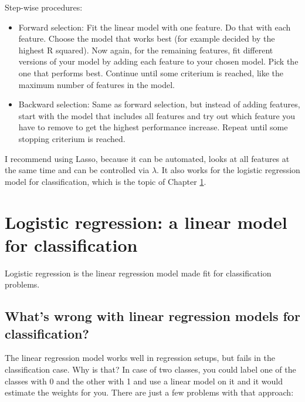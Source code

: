 \documentclass[12pt,]{krantz}
\providecommand{\tightlist}{%
  \setlength{\itemsep}{0pt}\setlength{\parskip}{0pt}}
\theoremstyle{definition}
\theoremstyle{definition}
\theoremstyle{definition}
\theoremstyle{remark}
\begin{document}
Step-wise procedures:

\begin{itemize}
\tightlist
\item
  Forward selection: Fit the linear model with one feature. Do that with
  each feature. Choose the model that works best (for example decided by
  the highest R squared). Now again, for the remaining features, fit
  different versions of your model by adding each feature to your chosen
  model. Pick the one that performs best. Continue until some criterium
  is reached, like the maximum number of features in the model.
\item
  Backward selection: Same as forward selection, but instead of adding
  features, start with the model that includes all features and try out
  which feature you have to remove to get the highest performance
  increase. Repeat until some stopping criterium is reached.
\end{itemize}

I recommend using Lasso, because it can be automated, looks at all
features at the same time and can be controlled via \(\lambda\). It also
works for the logistic regression model for classification, which is the
topic of Chapter \ref{logistic}.

\section{Logistic regression: a linear model for
classification}\label{logistic}

Logistic regression is the linear regression model made fit for
classification problems.

\subsection{What's wrong with linear regression models for
classification?}\label{whats-wrong-with-linear-regression-models-for-classification}

The linear regression model works well in regression setups, but fails
in the classification case. Why is that? In case of two classes, you
could label one of the classes with 0 and the other with 1 and use a
linear model on it and it would estimate the weights for you. There are
just a few problems with that approach:
\end{document}
